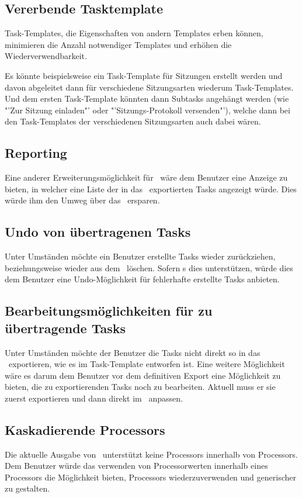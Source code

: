		
		\subsection{Vererbende Tasktemplate}
			Task-Templates, die Eigenschaften von andern Templates erben können, 
			minimieren die Anzahl notwendiger Templates und erhöhen die Wiederverwendbarkeit.
			
			Es könnte beispielsweise ein Task-Template für Sitzungen erstellt werden
			und davon abgeleitet dann für verschiedene Sitzungsarten wiederum Task-Templates.
			Und dem ersten Task-Template könnten dann Subtasks angehängt werden
			(wie "'Zur Sitzung einladen"' oder "'Sitzungs-Protokoll versenden"'),
			welche dann bei den Task-Templates der verschiedenen Sitzungsarten auch dabei wären.
			
		
		\subsection{Reporting}
			Eine anderer Erweiterungsmöglichkeit für \eeppi\ wäre dem Benutzer eine Anzeige zu bieten,
			in welcher eine Liste der in das \ppt\ exportierten Tasks angezeigt würde.
			Dies würde ihm den Umweg über das \ppt\ ersparen.
		
		
		\subsection{Undo von übertragenen Tasks}
			Unter Umständen möchte ein Benutzer erstellte Tasks wieder zurückziehen,
			beziehungsweise wieder aus dem \ppt\ löschen.
			Sofern \ppt s dies unterstützen, würde dies dem Benutzer eine Undo-Möglichkeit für fehlerhafte erstellte Tasks anbieten.
		
		
		\subsection{Bearbeitungsmöglichkeiten für zu übertragende Tasks}
			Unter Umständen möchte der Benutzer die Tasks nicht direkt so in das \ppt\ exportieren,
			wie es im Task-Template entworfen ist.
			Eine weitere Möglichkeit wäre es darum dem Benutzer vor dem definitiven Export eine Möglichkeit zu bieten,
			die zu exportierenden Tasks noch zu bearbeiten.
			Aktuell muss er sie zuerst exportieren und dann direkt im \ppt\ anpassen.
			
			
		\subsection{Kaskadierende Processors}
			Die aktuelle Ausgabe von \eeppi\ unterstützt keine Processors innerhalb von Processors.
			Dem Benutzer würde das verwenden von Processorwerten innerhalb eines Processors die Möglichkeit bieten, Processors wiederzuverwenden und generischer zu gestalten.
			
